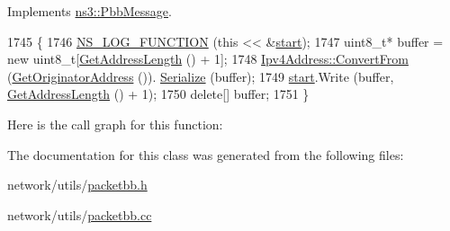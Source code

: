 Implements \hyperlink{classns3_1_1PbbMessage_ab224036cc9b2318b2ec8c11b9e439dee}{ns3\+::\+Pbb\+Message}.


\begin{DoxyCode}
1745 \{
1746   \hyperlink{log-macros-disabled_8h_a90b90d5bad1f39cb1b64923ea94c0761}{NS\_LOG\_FUNCTION} (\textcolor{keyword}{this} << &\hyperlink{namespacevisualizer_1_1core_a2a35e5d8a34af358b508dac8635754e0}{start});
1747   uint8\_t* buffer = \textcolor{keyword}{new} uint8\_t[\hyperlink{classns3_1_1PbbMessageIpv4_a5456c0d8d19d3be2795976e9c96be144}{GetAddressLength} () + 1];
1748   \hyperlink{classns3_1_1Ipv4Address_a5fd4a8f0f7bb75e35dad3d401ef4cbc1}{Ipv4Address::ConvertFrom} (\hyperlink{classns3_1_1PbbMessage_a28eaf6a89ecf70e54ecf4ae11971f074}{GetOriginatorAddress} ()).
      \hyperlink{classns3_1_1Ipv4Address_afa8e7c9d7347c91dfcf5dab3f4a71a2b}{Serialize} (buffer);
1749   \hyperlink{namespacevisualizer_1_1core_a2a35e5d8a34af358b508dac8635754e0}{start}.Write (buffer, \hyperlink{classns3_1_1PbbMessageIpv4_a5456c0d8d19d3be2795976e9c96be144}{GetAddressLength} () + 1);
1750   \textcolor{keyword}{delete}[] buffer;
1751 \}
\end{DoxyCode}


Here is the call graph for this function\+:




The documentation for this class was generated from the following files\+:\begin{DoxyCompactItemize}
\item 
network/utils/\hyperlink{packetbb_8h}{packetbb.\+h}\item 
network/utils/\hyperlink{packetbb_8cc}{packetbb.\+cc}\end{DoxyCompactItemize}
